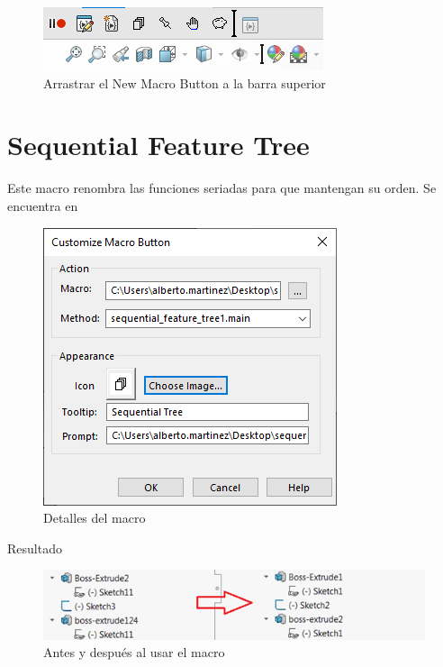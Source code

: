 \documentclass[12pt,letterpaper,final]{report}
\begin{document}
\begin{figure}[H]
	\centering
	\includegraphics[width=0.65\linewidth, height=0.5\textheight,keepaspectratio]{Imagenes/solidworks_macro_03}
	\caption{Arrastrar el New Macro Button a la barra superior}
	\label{fig:solidworksmacro03}
\end{figure}



	
\section{Sequential Feature Tree}

Este macro renombra las funciones seriadas para que mantengan su orden. Se encuentra en 

\begin{figure}[H]
	\centering
	\includegraphics[width=0.55\linewidth, height=0.5\textheight,keepaspectratio]{Imagenes/solidworks_macro_04}
	\caption{Detalles del macro}
	\label{fig:solidworksmacro04}
\end{figure}

{\LARGE Resultado}

\begin{figure}[H]
	\centering
	\includegraphics[width=0.85\linewidth, height=0.5\textheight,keepaspectratio]{Imagenes/solidworks_macro_07}
	\caption{Antes y después al usar el macro}
	\label{fig:solidworksmacro07}
\end{figure}
\end{document}
